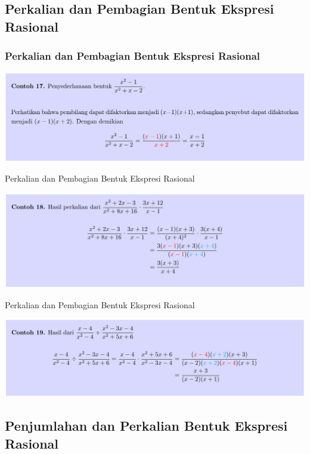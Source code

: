 \documentclass[pdflatex,compress,mathserif]{beamer}
\begin{document}
\subsection{Perkalian dan Pembagian Bentuk Ekspresi Rasional}

\begin{frame}
	\frametitle{Perkalian dan Pembagian Bentuk Ekspresi Rasional}
	\begin{center}
		\includegraphics[width=\linewidth]{img/img34}
	\end{center}
\end{frame}

\begin{frame}{Perkalian dan Pembagian Bentuk Ekspresi Rasional}
	\begin{center}
		\includegraphics[width=\linewidth]{img/img35}
	\end{center}
\end{frame}

\begin{frame}{Perkalian dan Pembagian Bentuk Ekspresi Rasional}
	\begin{center}
		\includegraphics[width=\linewidth]{img/img36}
	\end{center}
\end{frame}

\subsection{Penjumlahan dan Perkalian Bentuk Ekspresi Rasional}
\end{document}
